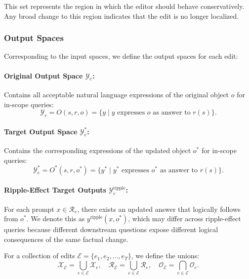 This set represents the region in which the editor should behave conservatively. Any broad change to this region indicates that the edit is no longer localized.

\subsubsection{Output Spaces}

Corresponding to the input spaces, we define the output spaces for each edit:

\paragraph{Original Output Space $\mathcal{Y}_e$:} Contains all acceptable natural language expressions of the original object $o$ for in-scope queries:
\begin{equation}
\mathcal{Y}_e = O(s, r, o) = \{y \mid y \text{ expresses } o \text{ as answer to } r(s)\}.
\end{equation}

\paragraph{Target Output Space $\mathcal{Y}_e^*$:} Contains the corresponding expressions of the updated object $o^*$ for in-scope queries:
\begin{equation}
\mathcal{Y}_e^* = O^*(s, r, o^*) = \{y^* \mid y^* \text{ expresses } o^* \text{ as answer to } r(s)\}.
\end{equation}

\paragraph{Ripple-Effect Target Outputs $\mathcal{Y}_e^{\text{ripple}}$:} For each prompt $x \in \mathcal{R}_e$, there exists an updated answer that logically follows from $o^*$. We denote this as $y^{\text{ripple}}(x, o^*)$, which may differ across ripple-effect queries because different downstream questions expose different logical consequences of the same factual change.

For a collection of edits $\mathcal{E} = \{e_1, e_2, \ldots, e_T\}$, we define the unions:
\begin{equation}
\mathcal{X}_{\mathcal{E}} = \bigcup_{e \in \mathcal{E}} \mathcal{X}_e, \quad
\mathcal{R}_{\mathcal{E}} = \bigcup_{e \in \mathcal{E}} \mathcal{R}_e, \quad
\mathcal{O}_{\mathcal{E}} = \bigcap_{e \in \mathcal{E}} \mathcal{O}_e.
\end{equation}

